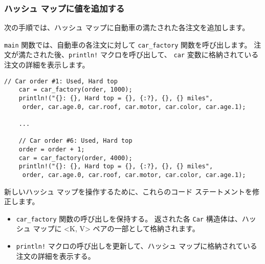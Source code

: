 \subsubsection{ハッシュ マップに値を追加する}

次の手順では、ハッシュ マップに自動車の満たされた各注文を追加します。

\texttt{main} 関数では、自動車の各注文に対して \texttt{car\_factory} 関数を呼び出します。 注文が満たされた後、\texttt{println!} マクロを呼び出して、 \texttt{car} 変数に格納されている注文の詳細を表示します。

\begin{lstlisting}[numbers=none]
    // Car order #1: Used, Hard top
    car = car_factory(order, 1000);
    println!("{}: {}, Hard top = {}, {:?}, {}, {} miles",
     order, car.age.0, car.roof, car.motor, car.color, car.age.1);

    ...

    // Car order #6: Used, Hard top
    order = order + 1;
    car = car_factory(order, 4000);
    println!("{}: {}, Hard top = {}, {:?}, {}, {} miles",
     order, car.age.0, car.roof, car.motor, car.color, car.age.1);
\end{lstlisting}

新しいハッシュ マップを操作するために、これらのコード ステートメントを修正します。

\begin{itemize}

\item \texttt{car\_factory} 関数の呼び出しを保持する。 返された各 \texttt{Car} 構造体は、ハッシュ マップに <K, V> ペアの一部として格納されます。

\item \texttt{println!} マクロの呼び出しを更新して、ハッシュ マップに格納されている注文の詳細を表示する。

\end{itemize}

